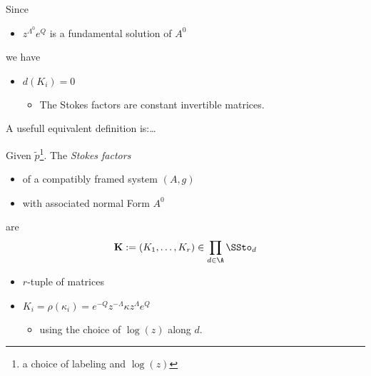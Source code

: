 \begin{paracol}{2}
\begin{defn}
\begin{itemize}
    \end{itemize}
  \end{defn}
  Since
  \begin{itemize}
    \item $z^{\Lambda^0}e^Q$ is a fundamental solution of $A^0$
  \end{itemize}
  we have
  \begin{itemize}
    \item $d(K_i)=0$
      \begin{itemize}
        \item The Stokes factors are constant invertible matrices.
      \end{itemize}
  \end{itemize}
  A usefull equivalent definition is:\dots
\end{paracol} %
\begin{defn}[1.27]
  Given $\tilde p$\footnote{a choice of labeling and $\log(z)$}.
  The \emph{Stokes factors}
  \begin{itemize}
    \item of a compatibly framed system $(A,g)$
    \item with associated normal Form $A^0$
  \end{itemize}
  are
  \[
    \textbf{K}:=(K_1,\dots,K_r)\in\prod_{d\in\A}\SSto_d
  \]
  \begin{itemize}
    \item $r$-tuple of matrices
    \item $K_i=\rho(\kappa_i)=e^{-Q}z^{-\Lambda}\kappa z^\Lambda e^Q$
      \begin{itemize}
        \item using the choice of $\log(z)$ along $d$.
      \end{itemize}
  \end{itemize}
\end{defn}
